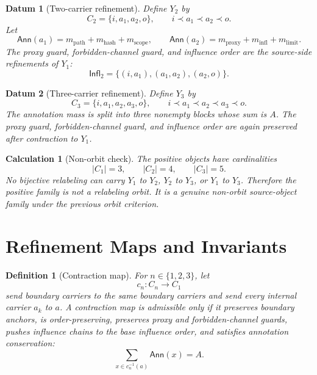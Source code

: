 \documentclass[11pt]{article}
\newcommand{\Ann}{\mathsf{Ann}}
\newcommand{\Infl}{\mathsf{Infl}}
\newtheorem{definitionblock}{Definition}
\newtheorem{datum}{Datum}
\newtheorem{calculation}{Calculation}
\begin{document}
\begin{datum}[Two-carrier refinement]
Define \(Y_{2}\) by
\[
    C_{2}=\{i,a_{1},a_{2},o\},\qquad i\prec a_{1}\prec a_{2}\prec o.
\]
Let
\[
    \Ann(a_{1})=
    m_{\mathrm{path}}+m_{\mathrm{hash}}+m_{\mathrm{scope}},\qquad
    \Ann(a_{2})=
    m_{\mathrm{proxy}}+m_{\mathrm{infl}}+m_{\mathrm{limit}}.
\]
The proxy guard, forbidden-channel guard, and influence order are the
source-side refinements of \(Y_{1}\):
\[
    \Infl_{2}=\{(i,a_{1}),(a_{1},a_{2}),(a_{2},o)\}.
\]
\end{datum}

\begin{datum}[Three-carrier refinement]
Define \(Y_{3}\) by
\[
    C_{3}=\{i,a_{1},a_{2},a_{3},o\},\qquad
    i\prec a_{1}\prec a_{2}\prec a_{3}\prec o.
\]
The annotation mass is split into three nonempty blocks whose sum is \(A\).
The proxy guard, forbidden-channel guard, and influence order are again
preserved after contraction to \(Y_{1}\).
\end{datum}

\begin{calculation}[Non-orbit check]
The positive objects have cardinalities
\[
    |C_{1}|=3,\qquad |C_{2}|=4,\qquad |C_{3}|=5.
\]
No bijective relabeling can carry \(Y_{1}\) to \(Y_{2}\), \(Y_{2}\) to
\(Y_{3}\), or \(Y_{1}\) to \(Y_{3}\). Therefore the positive family is not
a relabeling orbit. It is a genuine non-orbit source-object family under
the previous orbit criterion.
\end{calculation}

\section{Refinement Maps and Invariants}

\begin{definitionblock}[Contraction map]
For \(n\in\{1,2,3\}\), let
\[
    c_{n}:C_{n}\to C_{1}
\]
send boundary carriers to the same boundary carriers and send every
internal carrier \(a_{k}\) to \(a\). A contraction map is admissible only if
it preserves boundary anchors, is order-preserving, preserves proxy and
forbidden-channel guards, pushes influence chains to the base influence
order, and satisfies annotation conservation:
\[
    \sum_{x\in c_{n}^{-1}(a)} \Ann(x)=A.
\]
\end{definitionblock}
\end{document}
